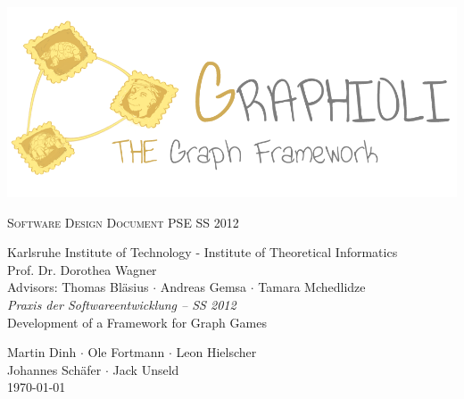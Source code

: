 \begin{titlepage}
\begin{center}

\begin{minipage}{1\linewidth}
	\vspace{2cm}
	\includegraphics[width=\textwidth]{../materials/images/logo.png}
	\vspace{2cm}
\end{minipage}
	
\fontsize{40}{50}\selectfont
        \textsc{Software Design Document}
        \vfill
\Large
PSE SS 2012
  \vfill
 \newpage
 
 \null
 \vfill
 \fontsize{12}{16}\selectfont
 Karlsruhe Institute of Technology - Institute of Theoretical Informatics \\
 Prof. Dr. Dorothea Wagner \\
 \vspace{.5cm}
 Advisors: Thomas Bläsius $\cdot$ Andreas Gemsa $\cdot$ Tamara Mchedlidze \\
 
 \vspace{2cm}
 \Large
 \emph{Praxis der Softwareentwicklung -- SS 2012} \\
 Development of a Framework for Graph Games \\
  \medskip
  \vspace{2cm}
  
    Martin Dinh $\cdot$ Ole Fortmann $\cdot$ Leon Hielscher \\ Johannes Schäfer $\cdot$ Jack Unseld
  \vspace{2cm} \\
  \today
\end{center}

  \vfill

\end{titlepage}
